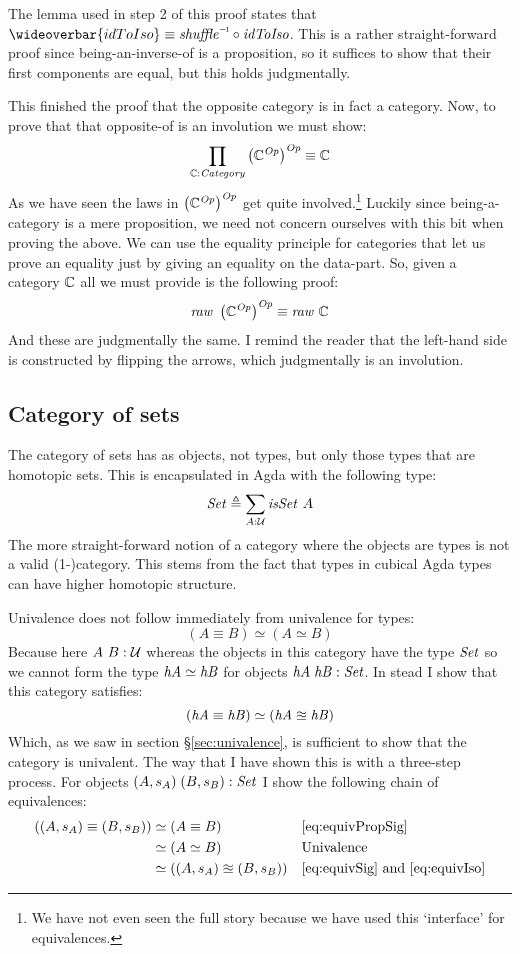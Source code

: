 The lemma used in step 2 of this proof states that $\wideoverbar{idToIso} \equiv
\inv{\shuffle} \comp \idToIso$. This is a rather straight-forward proof
since being-an-inverse-of is a proposition, so it suffices to show that their
first components are equal, but this holds judgmentally.

This finished the proof that the opposite category is in fact a category. Now,
to prove that that opposite-of is an involution we must show:
%
$$
\prod_{\bC \tp \Category} \left(\bC^{\var{Op}}\right)^{\var{Op}} \equiv \bC
$$
%
As we have seen the laws in $\left(\mathbb{C}^{\mathit{Op}}\right)^{\mathit{Op}}$ get quite
involved.\footnote{We have not even seen the full story because we have used
  this `interface' for equivalences.} Luckily since being-a-category is a mere
proposition, we need not concern ourselves with this bit when proving the above.
We can use the equality principle for categories that let us prove an equality
just by giving an equality on the data-part. So, given a category $\mathbb{C}$ all we
must provide is the following proof:
%
$$
\var{raw}\ \left(\bC^{\var{Op}}\right)^{\var{Op}} \equiv \var{raw}\ \bC
$$
%
And these are judgmentally the same. I remind the reader that the left-hand side
is constructed by flipping the arrows, which judgmentally is an involution.

\subsection{Category of sets}
The category of sets has as objects, not types, but only those types that are
homotopic sets. This is encapsulated in Agda with the following type:
%
$$\Set \defeq \sum_{A \tp \MCU} \isSet\ A$$
%
The more straight-forward notion of a category where the objects are types is
not a valid \mbox{(1-)category}. This stems from the fact that types in cubical
Agda types can have higher homotopic structure.

Univalence does not follow immediately from univalence for types:
%
$$(A \equiv B) \simeq (A \simeq B)$$
%
Because here $A\ B \mathrel{:} \mathcal{U}$ whereas the objects in this category have the type
$\Set$ so we cannot form the type $\mathit{hA} \simeq \mathit{hB}$ for objects
$\var{hA}\;\var{hB} \tp \Set$. In stead I show that this category
satisfies:
%
$$
(\mathit{hA} \equiv \mathit{hB}) \simeq (\mathit{hA} \approxeq \mathit{hB})
$$
%
Which, as we saw in section \S\ref{sec:univalence}, is sufficient to show that the
category is univalent. The way that I have shown this is with a three-step
process. For objects $(A, s_A)\; (B, s_B) \tp \Set$ I show the following chain
of equivalences:
%
\begin{align*}
((A, s_A) \equiv (B, s_B))
 & \simeq (A \equiv B) && \ref{eq:equivPropSig} \\
 & \simeq (A \simeq B) && \text{Univalence} \\
 & \simeq ((A, s_A) \approxeq (B, s_B)) && \text{\ref{eq:equivSig} and \ref{eq:equivIso}}
\end{align*}

